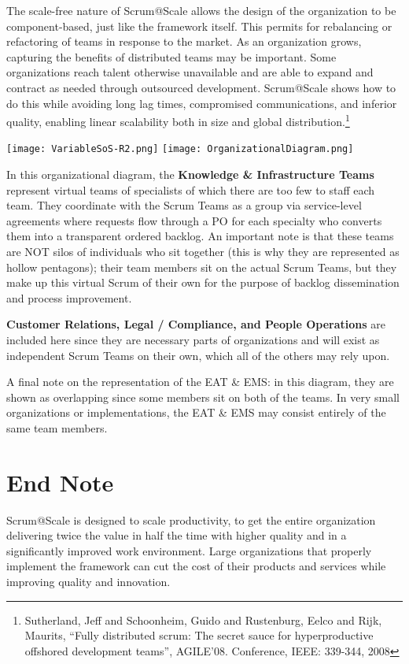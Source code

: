 \documentclass[12pt,a4paper,parskip=full]{scrartcl}
\begin{document}
The scale-free nature of Scrum@Scale allows the design of the organization to be component-based, just like the framework itself. This permits for rebalancing or refactoring of teams in response to the market. As an organization grows, capturing the benefits of distributed teams may be important. Some organizations reach talent otherwise unavailable and are able to expand and contract as needed through outsourced development. Scrum@Scale shows how to do this while avoiding long lag times, compromised communications, and inferior quality, enabling linear scalability both in size and global distribution.\footnote{Sutherland, Jeff and Schoonheim, Guido and Rustenburg, Eelco and Rijk, Maurits, ``Fully distributed scrum: The secret sauce for hyperproductive offshored development teams'', AGILE'08. Conference, IEEE: 339-344, 2008}

\texttt{[image: VariableSoS-R2.png]}
\texttt{[image: OrganizationalDiagram.png]}

In this organizational diagram, the \textbf{Knowledge \& Infrastructure Teams} represent virtual teams of specialists of which there are too few to staff each team. They coordinate with the Scrum Teams as a group via service-level agreements where requests flow through a PO for each specialty who converts them into a transparent ordered backlog. An important note is that these teams are NOT silos of individuals who sit together (this is why they are represented as hollow pentagons); their team members sit on the actual Scrum Teams, but they make up this virtual Scrum of their own for the purpose of backlog dissemination and process improvement.

\textbf{Customer Relations, Legal / Compliance, and People Operations} are included here since they are necessary parts of organizations and will exist as independent Scrum Teams on their own, which all of the others may rely upon.

A final note on the representation of the EAT \& EMS: in this diagram, they are shown as overlapping since some members sit on both of the teams. In very small organizations or implementations, the EAT \& EMS may consist entirely of the same team members.

\section{End Note}

Scrum@Scale is designed to scale productivity, to get the entire organization delivering twice the value in half the time with higher quality and in a significantly improved work environment. Large organizations that properly implement the framework can cut the cost of their products and services while improving quality and innovation.
\end{document}
